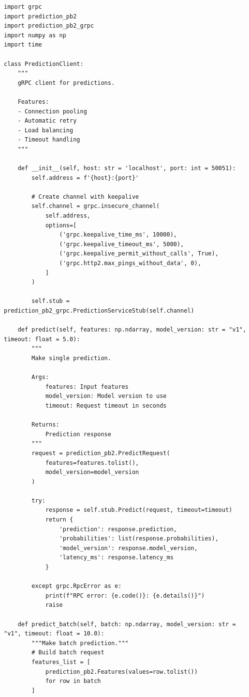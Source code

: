 \begin{lstlisting}[style=python, caption=gRPC client implementation]
import grpc
import prediction_pb2
import prediction_pb2_grpc
import numpy as np
import time

class PredictionClient:
    """
    gRPC client for predictions.

    Features:
    - Connection pooling
    - Automatic retry
    - Load balancing
    - Timeout handling
    """

    def __init__(self, host: str = 'localhost', port: int = 50051):
        self.address = f'{host}:{port}'

        # Create channel with keepalive
        self.channel = grpc.insecure_channel(
            self.address,
            options=[
                ('grpc.keepalive_time_ms', 10000),
                ('grpc.keepalive_timeout_ms', 5000),
                ('grpc.keepalive_permit_without_calls', True),
                ('grpc.http2.max_pings_without_data', 0),
            ]
        )

        self.stub = prediction_pb2_grpc.PredictionServiceStub(self.channel)

    def predict(self, features: np.ndarray, model_version: str = "v1", timeout: float = 5.0):
        """
        Make single prediction.

        Args:
            features: Input features
            model_version: Model version to use
            timeout: Request timeout in seconds

        Returns:
            Prediction response
        """
        request = prediction_pb2.PredictRequest(
            features=features.tolist(),
            model_version=model_version
        )

        try:
            response = self.stub.Predict(request, timeout=timeout)
            return {
                'prediction': response.prediction,
                'probabilities': list(response.probabilities),
                'model_version': response.model_version,
                'latency_ms': response.latency_ms
            }

        except grpc.RpcError as e:
            print(f"RPC error: {e.code()}: {e.details()}")
            raise

    def predict_batch(self, batch: np.ndarray, model_version: str = "v1", timeout: float = 10.0):
        """Make batch prediction."""
        # Build batch request
        features_list = [
            prediction_pb2.Features(values=row.tolist())
            for row in batch
        ]


\end{lstlisting}
